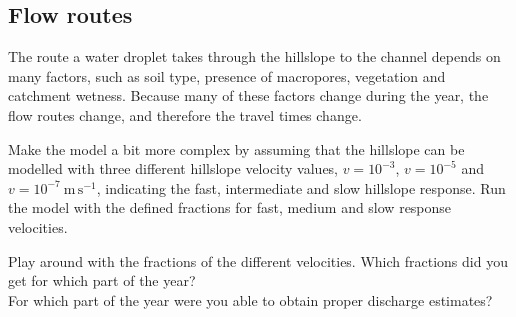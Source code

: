 \documentclass[twocolumn, 10pt, a4paper]{article}
\newenvironment{PC_prac_environment}{
\def\Q{\noindent \color{Gray}\rule[-0.1cm]{\columnwidth}{1.5pt}  \color{black} } \let\ques\Q 
\def\nQ{\noindent \color{black} } \let\ques\nQ 
\def\E{\color{Gray}\rule[0.3cm]{\columnwidth}{1.5pt} \color{black}} \let\ques\E }
\newcommand{\A}[2] { \ifthenelse{\boolean{showanswer}} {\noindent \color{cyan}{#2}\color{black}} {\multido{}{#1}{\noindent \color{light-gray}\hrulefill\\} } }
\begin{document}
\begin{PC_prac_environment}
\subsection{Flow routes}
The route a water droplet takes through the hillslope to the channel depends on many factors, such as soil type, presence of macropores, vegetation and catchment wetness. Because many of these factors change during the year, the flow routes change, and therefore the travel times change.

Make the model a bit more complex by assuming that the hillslope can be modelled with three different hillslope velocity values, $v=10^{-3}$, $v=10^{-5}$ and $v=10^{-7}~\mathrm{m\,s^{-1}}$, indicating the fast, intermediate and slow hillslope response. Run the model with the defined fractions for fast, medium and slow response velocities.

\Q Play around with the fractions of the different velocities. Which fractions did you get for which part of the year? \\
\nQ For which part of the year were you able to obtain proper discharge estimates?\\
\E


\end{PC_prac_environment}
\end{document}
